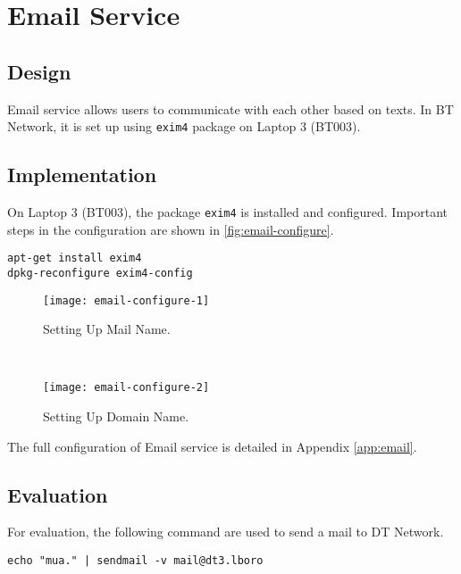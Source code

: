 \section{Email Service}
\label{sec:email}


\subsection{Design}
Email service\citep{rfc5322} allows users to communicate with each other based on texts. In BT Network, it is set up using \texttt{exim4} package on Laptop 3 (BT003).

\subsection{Implementation}
On Laptop 3 (BT003), the package \texttt{exim4} is installed and configured. Important steps in the configuration are shown in \ref{fig:email-configure}.

\begin{lstlisting}
apt-get install exim4
dpkg-reconfigure exim4-config
\end{lstlisting}

\begin{figure*}[ht!]
    \centering
    \begin{subfigure}[b]{\textwidth}
        \centering
        \texttt{[image: email-configure-1]}
        \caption{Setting Up Mail Name.}
    \end{subfigure}
    ~
    \begin{subfigure}[b]{\textwidth}
        \centering
        \texttt{[image: email-configure-2]}
        \caption{Setting Up Domain Name.}
    \end{subfigure}
    \caption{Important Configuration Steps for \texttt{exim4}.}
    \label{fig:email-configure}
\end{figure*}

The full configuration of Email service is detailed in Appendix \ref{app:email}.

\subsection{Evaluation}

For evaluation, the following command are used to send a mail to DT Network. 

\begin{lstlisting}
echo "mua." | sendmail -v mail@dt3.lboro
\end{lstlisting}

